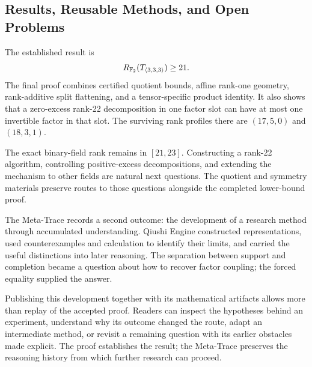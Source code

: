 \subsection{Results, Reusable Methods, and Open Problems}\label{route:outcome}

The established result is
\[
 R_{\mathbb{F}_2}(T_{\langle3,3,3\rangle})\ge21.
\]
The final proof combines certified quotient bounds, affine rank-one
geometry, rank-additive split flattening, and a tensor-specific product
identity. It also shows that a zero-excess rank-22 decomposition in
one factor slot can have at most one invertible factor in that slot.
The surviving rank profiles there are $(17,5,0)$ and $(18,3,1)$.

The exact binary-field rank remains in $[21,23]$. Constructing a
rank-22 algorithm, controlling positive-excess decompositions, and
extending the mechanism to other fields are natural next questions.
The quotient and symmetry materials preserve routes to those questions
alongside the completed lower-bound proof.

The Meta-Trace records a second outcome: the development of a research
method through accumulated understanding. Qiushi Engine constructed
representations, used counterexamples and calculation to identify their
limits, and carried the useful distinctions into later reasoning. The
separation between support and completion became a question about how
to recover factor coupling; the forced equality supplied the answer.

Publishing this development together with its mathematical artifacts
allows more than replay of the accepted proof. Readers can inspect
the hypotheses behind an experiment, understand why its outcome changed
the route, adapt an intermediate method, or revisit a remaining question
with its earlier obstacles made explicit. The proof establishes the
result; the Meta-Trace preserves the reasoning history from which
further research can proceed.
